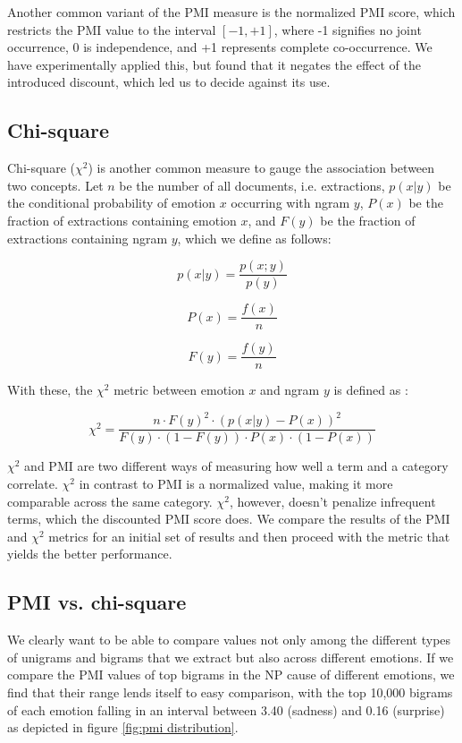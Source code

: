 Another common variant of the PMI measure is the normalized PMI score, which restricts the PMI value to the interval $[-1,+1]$, where -1 signifies no joint occurrence, 0 is independence, and +1 represents complete co-occurrence. We have experimentally applied this, but found that it negates the effect of the introduced discount, which led us to decide against its use.

\subsection{Chi-square}

Chi-square ($\chi^{2}$) is another common measure to gauge the association between two concepts. Let $n$ be the number of all documents, i.e. extractions, $p(x|y)$ be the conditional probability of emotion $x$ occurring with ngram $y$, $P(x)$ be the fraction of extractions containing emotion $x$, and $F(y)$ be the fraction of extractions containing ngram $y$, which we define as follows:

$$p(x|y) = \frac{p(x;y)}{p(y)}$$

$$P(x) = \frac{f(x)}{n}$$

$$F(y) = \frac{f(y)}{n}$$

With these, the $\chi^{2}$ metric between emotion $x$ and ngram $y$ is defined as \cite{chi-square}: 

$$\chi^{2} = \frac{n \cdot F(y)^{2} \cdot (p(x|y) - P(x))^{2}}{F(y) \cdot (1 - F(y)) \cdot P(x) \cdot (1 - P(x))}$$

$\chi^{2}$ and PMI are two different ways of measuring how well a term and a category correlate. $\chi^{2}$ in contrast to PMI is a normalized value, making it more comparable across the same category. $\chi^{2}$, however, doesn't penalize infrequent terms, which the discounted PMI score does. We compare the results of the PMI and $\chi^{2}$ metrics for an initial set of results and then proceed with the metric that yields the better performance.

\subsection{PMI vs. chi-square}

We clearly want to be able to compare values not only among the different types of unigrams and bigrams that we extract but also across different emotions. If we compare the PMI values of top bigrams in the NP cause of different emotions, we find that their range lends itself to easy comparison, with the top 10,000 bigrams of each emotion falling in an interval between 3.40 (sadness) and 0.16 (surprise) as depicted in figure \ref{fig:pmi distribution}.

